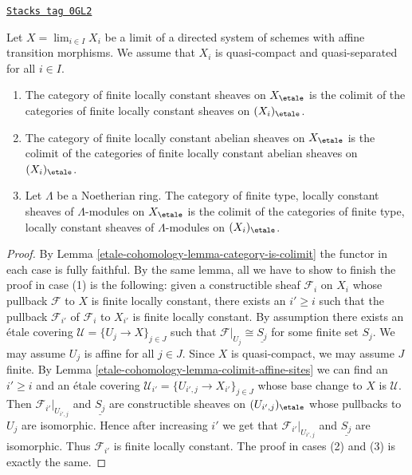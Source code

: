 \begin{lemma}
\label{etale-cohomology-lemma-category-loc-cst-is-colimit}
\href{https://stacks.math.columbia.edu/tag/0GL2}{\texttt{Stacks tag 0GL2}}

Let $X = \lim_{i \in I} X_i$ be a limit of a directed
system of schemes with affine transition morphisms.
We assume that $X_i$ is quasi-compact and quasi-separated
for all $i \in I$.
\begin{enumerate}
\item The category of finite locally constant sheaves on $X_\etale$
is the colimit of the categories of finite locally constant sheaves
on $(X_i)_\etale$.
\item The category of finite locally constant abelian sheaves on $X_\etale$
is the colimit of the categories of finite locally constant abelian sheaves
on $(X_i)_\etale$.
\item Let $\Lambda$ be a Noetherian ring. The category of finite type,
locally constant sheaves of $\Lambda$-modules on $X_\etale$
is the colimit of the categories of finite type, locally constant
sheaves of $\Lambda$-modules on $(X_i)_\etale$.
\end{enumerate}
\end{lemma}

\begin{proof}
By Lemma \ref{etale-cohomology-lemma-category-is-colimit} the functor in each case
is fully faithful. By the same lemma, all we have to show to finish
the proof in case (1) is the following: given a constructible sheaf
$\mathcal{F}_i$ on $X_i$ whose pullback $\mathcal{F}$ to $X$ is
finite locally constant, there exists an $i' \geq i$ such that the
pullback $\mathcal{F}_{i'}$ of $\mathcal{F}_i$ to $X_{i'}$
is finite locally constant. By assumption there exists an \'etale covering
$\mathcal{U} = \{U_j \to X\}_{j \in J}$
such that $\mathcal{F}|_{U_j} \cong \underline{S_j}$ for some finite set $S_j$.
We may assume $U_j$ is affine for all $j \in J$.
Since $X$ is quasi-compact, we may assume $J$ finite.
By Lemma \ref{etale-cohomology-lemma-colimit-affine-sites} we can find an $i' \geq i$
and an \'etale covering $\mathcal{U}_{i'} = \{U_{i', j} \to X_{i'}\}_{j \in J}$
whose base change to $X$ is $\mathcal{U}$. Then
$\mathcal{F}_{i'}|_{U_{i', j}}$ and $\underline{S_j}$ are
constructible sheaves on $(U_{i', j})_\etale$ whose pullbacks to
$U_j$ are isomorphic. Hence after increasing $i'$ we get
that $\mathcal{F}_{i'}|_{U_{i', j}}$ and $\underline{S_j}$
are isomorphic. Thus $\mathcal{F}_{i'}$ is finite locally constant.
The proof in cases (2) and (3) is exactly the same.
\end{proof}

